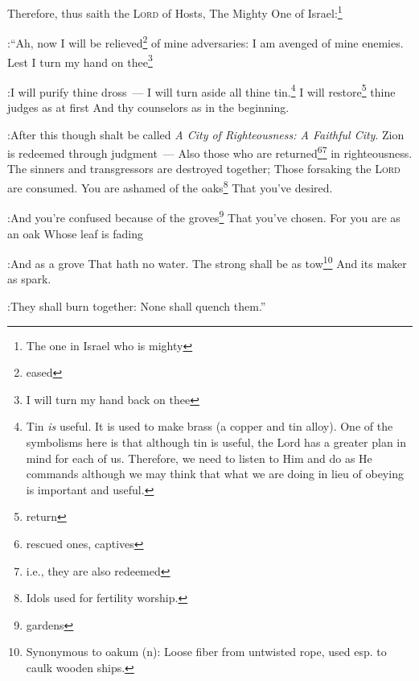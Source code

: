 \begin{inparaenum}
   Therefore, thus saith the \textsc{Lord} of Hosts, The Mighty One of Israel:\footnote{The one in Israel who is mighty}%

:``Ah, now I will be relieved\footnote{eased} of mine adversaries: I am avenged of mine enemies.%
   Lest I turn my hand on thee\footnote{I will turn my hand back on thee}%

:I will purify thine dross~--- I will turn aside all thine tin.\footnote{Tin \emph{is} useful. It is used to make brass (a copper and tin alloy). One of the symbolisms here is that although tin is useful, the Lord has a greater plan in mind for each of us. Therefore, we need to listen to Him and do as He commands although we may think that what we are doing in lieu of obeying is important and useful.}%
   I will restore\footnote{return} thine judges as at first And thy counselors as in the beginning.%

:After this though shalt be called \textit{A City of Righteousness: A Faithful City}.%
   Zion is redeemed through judgment~--- Also those who are returned\footnote{rescued ones, captives}\footnote{i.e., they are also redeemed} in righteousness.%
   The sinners and transgressors are destroyed together; Those forsaking the \textsc{Lord} are consumed.%
   You are ashamed of the oaks\footnote{Idols used for fertility worship.} That you've desired.%

:And you're confused because of the groves\footnote{gardens} That you've chosen.%
   For you are as an oak Whose leaf is fading%

:And as a grove That hath no water.%
   The strong shall be as tow\footnote{Synonymous to oakum (n): Loose fiber from untwisted rope, used esp. to caulk wooden ships.} And its maker as spark.%

:They shall burn together: None shall quench them.''%
\end{inparaenum}
